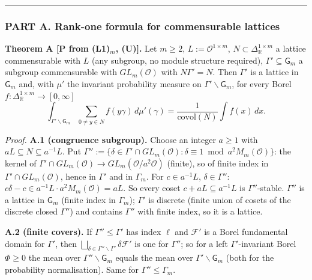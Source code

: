 \begin{center}\rule{0.5\linewidth}{0.5pt}\end{center}

\hypertarget{part-a.-rank-one-formula-for-commensurable-lattices}{%
\subsubsection*{PART A. Rank-one formula for commensurable lattices}\label{part-a.-rank-one-formula-for-commensurable-lattices}}

\textbf{Theorem A {[}P from (L1)\(_m\), (U){]}.} Let \(m\ge2\), \(L:=\mathcal O^{1\times m}\), \(N\subset\Delta_{\mathbb R}^{1\times m}\) a lattice commensurable with \(L\) (any subgroup, no module structure required), \(\Gamma'\subseteq\mathsf G_m\) a subgroup commensurable with \(GL_m(\mathcal O)\) with \(N\Gamma'=N\). Then \(\Gamma'\) is a lattice in \(\mathsf G_m\) and, with \(\mu'\) the invariant probability measure on \(\Gamma'\backslash\mathsf G_m\), for every Borel \(f:\Delta_{\mathbb R}^{1\times m}\to[0,\infty]\)
\[\int_{\Gamma'\backslash\mathsf G_m}\sum_{0\ne y\in N}f(y\gamma)\,d\mu'(\gamma)=\frac1{\mathrm{covol}(N)}\int f(x)\,dx .\]

\emph{Proof.} \textbf{A.1 (congruence subgroup).} Choose an integer \(a\ge1\) with \(aL\subseteq N\subseteq a^{-1}L\). Put \(\Gamma'':=\{\delta\in\Gamma'\cap GL_m(\mathcal O):\delta\equiv1\bmod a^2M_m(\mathcal O)\}\): the kernel of \(\Gamma'\cap GL_m(\mathcal O)\to GL_m(\mathcal O/a^2\mathcal O)\) (finite), so of finite index in \(\Gamma'\cap GL_m(\mathcal O)\), hence in \(\Gamma'\) and in \(\Gamma_m\). For \(c\in a^{-1}L\), \(\delta\in\Gamma''\): \(c\delta-c\in a^{-1}L\cdot a^2M_m(\mathcal O)=aL\). So every coset \(c+aL\subseteq a^{-1}L\) is \(\Gamma''\)-stable. \(\Gamma''\) is a lattice in \(\mathsf G_m\) (finite index in \(\Gamma_m\)); \(\Gamma'\) is discrete (finite union of cosets of the discrete closed \(\Gamma''\)) and contains \(\Gamma''\) with finite index, so it is a lattice.

\textbf{A.2 (finite covers).} If \(\Gamma''\le\Gamma'\) has index \(\ell\) and \(\mathcal F'\) is a Borel fundamental domain for \(\Gamma'\), then \(\bigsqcup_{\delta\in\Gamma''\backslash\Gamma'}\delta\mathcal F'\) is one for \(\Gamma''\); so for a left \(\Gamma'\)-invariant Borel \(\Phi\ge0\) the mean over \(\Gamma''\backslash\mathsf G_m\) equals the mean over \(\Gamma'\backslash\mathsf G_m\) (both for the probability normalisation). Same for \(\Gamma''\le\Gamma_m\).

